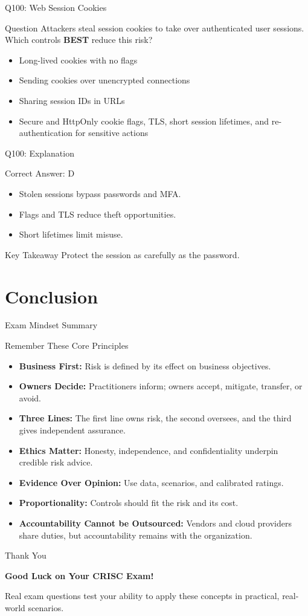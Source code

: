 \documentclass[aspectratio=169]{beamer}
\newcommand{\hq}[7]{%
	\begin{frame}{Q#1: #2}
		\begin{block}{Question}
			#3
		\end{block}
		\begin{itemize}
			#4
		\end{itemize}
	\end{frame}
	\begin{frame}{Q#1: Explanation}
		\begin{block}{Correct Answer: #5}
			\begin{itemize}
				#6
			\end{itemize}
		\end{block}
		\begin{alertblock}{Key Takeaway}
			#7
		\end{alertblock}
	\end{frame}
}
\begin{document}
	\hq{100}{Web Session Cookies}
	{Attackers steal session cookies to take over authenticated user sessions. Which controls \textbf{BEST} reduce this risk?}
	{\item[\textbf{(A)}] Long-lived cookies with no flags
		\item[\textbf{(B)}] Sending cookies over unencrypted connections
		\item[\textbf{(C)}] Sharing session IDs in URLs
		\item[\textbf{(D)}] Secure and HttpOnly cookie flags, TLS, short session lifetimes, and re-authentication for sensitive actions}
	{D}
	{\item Stolen sessions bypass passwords and MFA.
		\item Flags and TLS reduce theft opportunities.
		\item Short lifetimes limit misuse.}
	{Protect the session as carefully as the password.}

	\section{Conclusion}

	\begin{frame}{Exam Mindset Summary}
		\begin{block}{Remember These Core Principles}
			\begin{itemize}
				\item \textbf{Business First:} Risk is defined by its effect on business objectives.
				\item \textbf{Owners Decide:} Practitioners inform; owners accept, mitigate, transfer, or avoid.
				\item \textbf{Three Lines:} The first line owns risk, the second oversees, and the third gives independent assurance.
				\item \textbf{Ethics Matter:} Honesty, independence, and confidentiality underpin credible risk advice.
				\item \textbf{Evidence Over Opinion:} Use data, scenarios, and calibrated ratings.
				\item \textbf{Proportionality:} Controls should fit the risk and its cost.
				\item \textbf{Accountability Cannot be Outsourced:} Vendors and cloud providers share duties, but accountability remains with the organization.
			\end{itemize}
		\end{block}
	\end{frame}

	\begin{frame}{Thank You}
		\begin{center}
			{\Huge \textbf{Good Luck on Your CRISC Exam!}}

			\vspace{1cm}

			\normalsize
			Real exam questions test your ability to apply these concepts in practical, real-world scenarios.
		\end{center}
	\end{frame}
\end{document}
